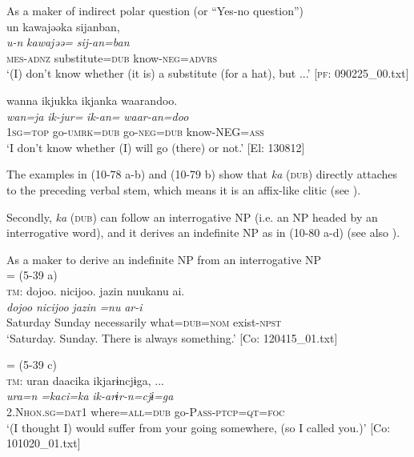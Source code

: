 \ea\label{ex:10.79}   As a maker of indirect polar question (or “Yes-no question”)\\
  \ea  %
      \glll    un  kawajəəka  sijanban,\\
      \textit{u-n}  \textit{kawajəə=}  \textit{sij-an=ban}\\
      \textsc{mes}-\textsc{adnz}  substitute=\textsc{dub}  know-\textsc{neg}=\textsc{advrs}\\
      \glt       ‘(I) don’t know whether (it is) a substitute (for a hat), but ...’ [\textsc{pf}: 090225\_00.txt]

  \ex  %
      \glll    wanna  ikjukka  ikjanka  waarandoo.\\
      \textit{wan=ja}  \textit{ik-jur=}  \textit{ik-an=}  \textit{waar-an=doo}\\
      1\textsc{sg}=\textsc{top}  go-\textsc{umrk}=\textsc{dub}  go-\textsc{neg}=\textsc{dub}  know-NEG=\textsc{ass}\\
      \glt       ‘I don’t know whether (I) will go (there) or not.’ [El: 130812]
    \z
\z

The examples in (10-78 a-b) and (10-79 b) show that \textit{ka} (\textsc{dub}) directly attaches to the preceding verbal stem, which means it is an affix-like clitic (see ).

  Secondly, \textit{ka} (\textsc{dub}) can follow an interrogative NP (i.e. an NP headed by an interrogative word), and it derives an indefinite NP as in (10-80 a-d) (see also ).

\ea\label{ex:10.80}   As a maker to derive an indefinite NP from an interrogative NP\\
   \ea{} = (5-39 a)\\
    \textsc{tm}:
      \glll    {\textbar}dojoo{\textbar}.  {\textbar}nicijoo{\textbar}.  jazin  nuukanu  ai.\\
      \textit{dojoo}  \textit{nicijoo}  \textit{jazin}  \textit{=nu}  \textit{ar-i}\\
      Saturday  Sunday  necessarily  what=\textsc{dub}=\textsc{nom}  exist-\textsc{npst}\\
      \glt       ‘Saturday. Sunday. There is always something.’ [Co: 120415\_01.txt]

  \ex{} = (5-39 c)\\
    \textsc{tm}:
      \glll    uran  daacika  ikjarɨncjɨga, ...\\
      \textit{ura=n}  \textit{=kaci=ka}  \textit{ik-arɨr-n=cjɨ=ga}\\
      2.N\textsc{hon}.\textsc{sg}=\textsc{dat}1  where=\textsc{all}=\textsc{dub}  go-P\textsc{ass}-\textsc{ptcp}=\textsc{qt}=\textsc{foc}\\
      \glt       ‘(I thought I) would suffer from your going somewhere, (so I called you.)’ [Co: 101020\_01.txt]

